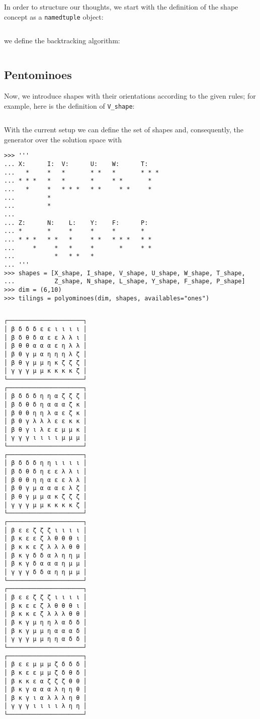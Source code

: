 In order to structure our thoughts, we start with the definition of the shape
concept as a \verb|namedtuple| object:
\inputminted[fontsize=\small,stripnl=false,firstline=4, lastline=6]{python}{backtracking/polyominoes.py}
we define the backtracking algorithm: \newpage
\inputminted[fontsize=\small,stripnl=false,firstline=8, lastline=60]{python}{backtracking/polyominoes.py}

\subsection{Pentominoes}

Now, we introduce shapes with their orientations according to the given rules;
for example, here is the definition of \verb|V_shape|:
\inputminted[fontsize=\small,stripnl=false,firstline=193, lastline=205]{python}{backtracking/polyominoes.py}

With the current setup we can define the set of shapes and, consequently, the
generator over the solution space with
\begin{verbatim}
>>> '''
... X:      I:  V:      U:    W:      T:
...   *     *   *       * *   *       * * *
... * * *   *   *       *     * *       *
...   *     *   * * *   * *     * *     *
...         *
...         *
...
... Z:      N:    L:    Y:    F:      P:
... *       *     *     *     *       *
... * * *   * *   *     * *   * * *   * *
...     *     *   *     *       *     * *
...           *   * *   *
... '''
>>> shapes = [X_shape, I_shape, V_shape, U_shape, W_shape, T_shape,
...           Z_shape, N_shape, L_shape, Y_shape, F_shape, P_shape]
>>> dim = (6,10)
>>> tilings = polyominoes(dim, shapes, availables="ones")
\end{verbatim}
\begin{margintable}[-5cm]
\inputminted[fontsize=\footnotesize,]{python}{backtracking/pentominoes-regular-snippet.py}
{\footnotesize
\begin{verbatim}
┌─────────────────────┐
│ β δ δ δ ε ε ι ι ι ι │
│ β δ θ δ α ε ε λ λ ι │
│ β θ θ α α α ε η λ λ │
│ β θ γ μ α η η η λ ζ │
│ β θ γ μ μ η κ ζ ζ ζ │
│ γ γ γ μ μ κ κ κ κ ζ │
└─────────────────────┘
┌─────────────────────┐
│ β δ δ δ η η α ζ ζ ζ │
│ β δ θ δ η α α α ζ κ │
│ β θ θ η η λ α ε ζ κ │
│ β θ γ λ λ λ ε ε κ κ │
│ β θ γ ι λ ε ε μ μ κ │
│ γ γ γ ι ι ι ι μ μ μ │
└─────────────────────┘
┌─────────────────────┐
│ β δ δ δ η η ι ι ι ι │
│ β δ θ δ η ε ε λ λ ι │
│ β θ θ η η α ε ε λ λ │
│ β θ γ μ α α α ε λ ζ │
│ β θ γ μ μ α κ ζ ζ ζ │
│ γ γ γ μ μ κ κ κ κ ζ │
└─────────────────────┘
┌─────────────────────┐
│ β ε ε ζ ζ ζ ι ι ι ι │
│ β κ ε ε ζ λ θ θ θ ι │
│ β κ κ ε ζ λ λ λ θ θ │
│ β κ γ δ δ α λ η η μ │
│ β κ γ δ α α α η μ μ │
│ γ γ γ δ δ α η η μ μ │
└─────────────────────┘
┌─────────────────────┐
│ β ε ε ζ ζ ζ ι ι ι ι │
│ β κ ε ε ζ λ θ θ θ ι │
│ β κ κ ε ζ λ λ λ θ θ │
│ β κ γ μ η η λ α δ δ │
│ β κ γ μ μ η α α α δ │
│ γ γ γ μ μ η η α δ δ │
└─────────────────────┘
┌─────────────────────┐
│ β ε ε μ μ μ ζ δ δ δ │
│ β κ ε ε μ μ ζ δ θ δ │
│ β κ κ ε α ζ ζ ζ θ θ │
│ β κ γ α α α λ η η θ │
│ β κ γ ι α λ λ λ η θ │
│ γ γ γ ι ι ι ι λ η η │
└─────────────────────┘
\end{verbatim}
}
\end{margintable}

